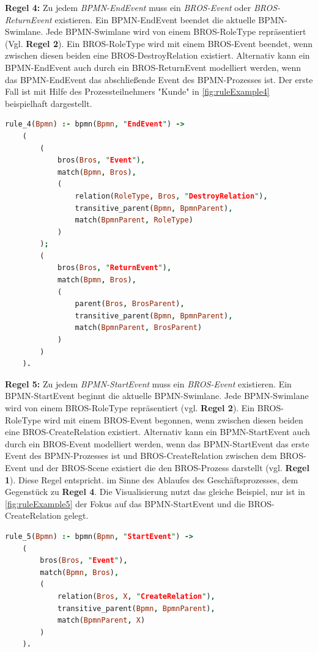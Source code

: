 \textbf{Regel 4:}
Zu jedem \emph{BPMN-EndEvent} muss ein \emph{BROS-Event} oder \emph{BROS-ReturnEvent} existieren.
Ein BPMN-EndEvent beendet die aktuelle BPMN-Swimlane.
Jede BPMN-Swimlane wird von einem BROS-RoleType repräsentiert (Vgl. \textbf{Regel 2}).
Ein BROS-RoleType wird mit einem BROS-Event beendet, wenn zwischen diesen beiden eine BROS-DestroyRelation existiert.
Alternativ kann ein BPMN-EndEvent auch durch ein BROS-ReturnEvent modelliert werden, wenn das BPMN-EndEvent das abschließende Event des BPMN-Prozesses ist.
Der erste Fall ist mit Hilfe des Prozessteilnehmers "Kunde" in \cref{fig:ruleExample4} beispielhaft dargestellt.

\begin{lstlisting}[language=Prolog, caption=Formalisierung der Regel 4, label=lst:rule_4]
rule_4(Bpmn) :- bpmn(Bpmn, "EndEvent") ->
    (
        (
            bros(Bros, "Event"),
            match(Bpmn, Bros),
            (
                relation(RoleType, Bros, "DestroyRelation"),
                transitive_parent(Bpmn, BpmnParent),
                match(BpmnParent, RoleType)
            )
        );
        (
            bros(Bros, "ReturnEvent"), 
            match(Bpmn, Bros),
            (
                parent(Bros, BrosParent),
                transitive_parent(Bpmn, BpmnParent),
                match(BpmnParent, BrosParent)
            )
        )
    ).
\end{lstlisting}

\textbf{Regel 5:}
Zu jedem \emph{BPMN-StartEvent} muss ein \emph{BROS-Event} existieren.
Ein BPMN-StartEvent beginnt die aktuelle BPMN-Swimlane.
Jede BPMN-Swimlane wird von einem BROS-RoleType repräsentiert (vgl. \textbf{Regel 2}).
Ein BROS-RoleType wird mit einem BROS-Event begonnen, wenn  zwischen diesen beiden eine BROS-CreateRelation existiert.
Alternativ kann ein BPMN-StartEvent auch durch ein BROS-Event modelliert werden, wenn das BPMN-StartEvent das erste Event des BPMN-Prozesses ist und BROS-CreateRelation zwischen dem BROS-Event und der BROS-Scene existiert die den BROS-Prozess darstellt (vgl. \textbf{Regel 1}).
Diese Regel entspricht. im Sinne des Ablaufes des Geschäftsprozesses, dem Gegenstück zu \textbf{Regel 4}.
Die Visualisierung nutzt das gleiche Beispiel, nur ist in \cref{fig:ruleExample5} der Fokus auf das BPMN-StartEvent und die BROS-CreateRelation gelegt.

\begin{lstlisting}[language=Prolog, caption=Formalisierung der Regel 5, label=lst:rule_5]
rule_5(Bpmn) :- bpmn(Bpmn, "StartEvent") ->
    (
        bros(Bros, "Event"),
        match(Bpmn, Bros),
        (
            relation(Bros, X, "CreateRelation"),
            transitive_parent(Bpmn, BpmnParent),
            match(BpmnParent, X)
        )
    ).
\end{lstlisting}

